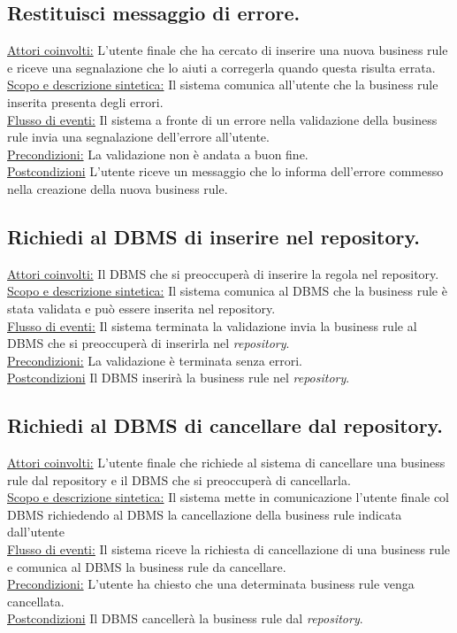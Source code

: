 \documentclass[11pt,titlepage,a4paper]{report}
\begin{document}
\subsection{Restituisci messaggio di errore.}
\underline{Attori coinvolti:} L'utente finale che ha cercato di inserire una nuova business rule e riceve una segnalazione che lo aiuti a corregerla quando questa risulta errata.\\
\underline{Scopo e descrizione sintetica:} Il sistema comunica all'utente che la business rule inserita presenta degli errori.\\
\underline{Flusso di eventi:} Il sistema  a fronte di un errore nella validazione della business rule invia una segnalazione dell'errore all'utente.\\
\underline{Precondizioni:} La validazione non \`e andata a buon fine.\\
\underline{Postcondizioni} L'utente riceve un messaggio che lo informa dell'errore commesso nella creazione della nuova business rule.

\subsection{Richiedi al DBMS di inserire nel repository.}
\underline{Attori coinvolti:} Il DBMS che si preoccuper\`a di inserire la regola nel repository.\\
\underline{Scopo e descrizione sintetica:} Il sistema comunica al DBMS che la business rule \`e stata validata e pu\`o essere inserita nel repository.\\
\underline{Flusso di eventi:} Il sistema  terminata la validazione invia la business rule al DBMS che si preoccuper\`a di inserirla nel \textit{repository}.\\
\underline{Precondizioni:} La validazione \`e terminata senza errori.\\
\underline{Postcondizioni} Il DBMS inserir\`a la business rule nel \textit{repository}.

\subsection{Richiedi al DBMS di cancellare dal repository.}
\underline{Attori coinvolti:} L'utente finale che richiede al sistema di cancellare una business rule dal repository e il DBMS che si preoccuper\`a di cancellarla.\\
\underline{Scopo e descrizione sintetica:} Il sistema mette in comunicazione l'utente finale col DBMS richiedendo al DBMS la cancellazione della business rule indicata dall'utente\\
\underline{Flusso di eventi:} Il sistema riceve la richiesta di cancellazione di una business rule e comunica al DBMS la business rule da cancellare.\\
\underline{Precondizioni:} L'utente ha chiesto che una determinata business rule venga cancellata.\\
\underline{Postcondizioni} Il DBMS canceller\`a la business rule dal \textit{repository}.
\end{document}
